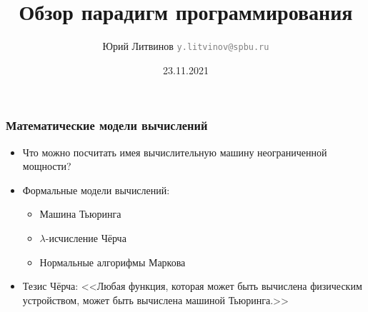 \documentclass[xetex,mathserif,serif]{beamer}
\title{Обзор парадигм программирования}
\author[Юрий Литвинов]{Юрий Литвинов \newline \textcolor{gray}{\small\texttt{y.litvinov@spbu.ru}}}
\date{23.11.2021}
\begin{document}
    
    \frame{\titlepage}

    \begin{frame}
        \frametitle{Математические модели вычислений}
        \begin{itemize}
            \item Что можно посчитать имея вычислительную машину неограниченной мощности?
            \item Формальные модели вычислений:
            \begin{itemize}
                \item Машина Тьюринга
                \item $\lambda$-исчисление Чёрча
                \item Нормальные алгорифмы Маркова
            \end{itemize}
            \item Тезис Чёрча: <<Любая функция, которая может быть вычислена физическим устройством, может быть вычислена машиной Тьюринга.>>
        \end{itemize}
    \end{frame}
\end{document}
